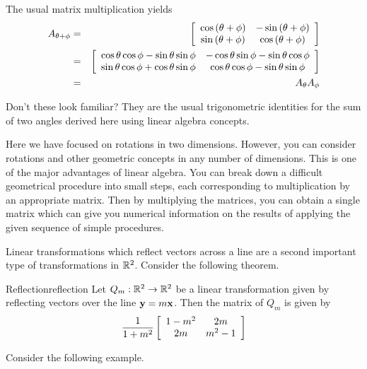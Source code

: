 \begin{solution}
The usual matrix multiplication 
yields
\begin{eqnarray*}
A_{\theta +\phi } &=& \left[
\begin{array}{cc}
\cos \left( \theta +\phi \right) & -\sin \left( \theta +\phi \right) \\
\sin \left( \theta +\phi \right) & \cos \left( \theta +\phi \right)
\end{array}
\right] \\
&=&\left[
\begin{array}{cc}
\cos \theta \cos \phi -\sin \theta \sin \phi & -\cos \theta \sin \phi -\sin
\theta \cos \phi \\
\sin \theta \cos \phi +\cos \theta \sin \phi & \cos \theta \cos \phi -\sin
\theta \sin \phi
\end{array}
\right] \\
&=& A_{\theta }A_{\phi } 
\end{eqnarray*}

Don't these look familiar? They are the usual trigonometric identities for the sum
of two angles derived here using linear algebra concepts.

\end{solution}

Here we have focused on rotations in two dimensions. However, you can consider rotations and
other geometric concepts in any number of dimensions. This is one of the
major advantages of linear algebra. You can break down a difficult
geometrical procedure into small steps, each corresponding to multiplication
by an appropriate matrix. Then by multiplying the matrices, you can obtain a
single matrix which can give you numerical information on the results of
applying the given sequence of simple procedures.


Linear transformations which reflect vectors across a line are a second important type of transformations in $\mathbb{R}^2$. Consider the following theorem.

\begin{theorem}{Reflection}{reflection}
Let $Q_m: \mathbb{R}^2 \to \mathbb{R}^2$ be a linear transformation given by reflecting vectors over the line ${\bf y}=m{\bf x}$. Then the matrix of $Q_m$ is given by 
\[
\frac{1}{1+m^2}
\left[
\begin{array}{cc}
1-m^2 & 2m \\
2m & m^2-1 
\end{array}
\right]
\]
\end{theorem}

Consider the following example. 


